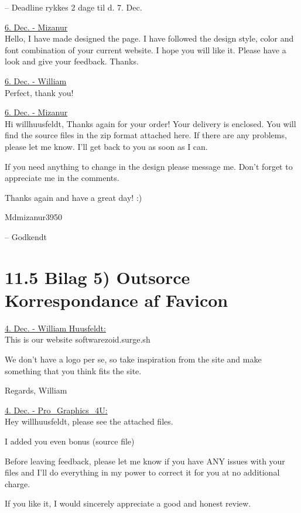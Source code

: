\documentclass[11pt]{report}
\begin{document}
\noindent -- Deadline rykkes 2 dage til d. 7. Dec.

\noindent\underline{6. Dec. - Mizanur}\\
\noindent Hello, I have made designed the page. I have followed the design style, color and font combination of your current website. I hope you will like it. Please have a look and give your feedback. Thanks.

\noindent\underline{6. Dec. - William}\\
\noindent Perfect, thank you!

\noindent\underline{6. Dec. - Mizanur}\\
\noindent Hi willhuusfeldt,
\noindent Thanks again for your order! Your delivery is enclosed. You will find the source files in the zip format attached here. If there are any problems, please let me know. I'll get back to you as soon as I can.

\noindent If you need anything to change in the design please message me. Don't forget to appreciate me in the comments.

\noindent Thanks again and have a great day! :)

\noindent Mdmizanur3950

\noindent -- Godkendt


\newpage
\section*{11.5 Bilag 5) Outsorce Korrespondance af Favicon}


\noindent\underline{4. Dec. - William Huusfeldt:}\\
\noindent This is our website softwarezoid.surge.sh

\noindent We don't have a logo per se, so take inspiration from the site and make something that you think fits the site.

\noindent Regards, William

\noindent\underline{4. Dec. - Pro\_Graphics\_4U:}\\
\noindent Hey willhuusfeldt, please see the attached files.

\noindent I added you even bonus (source file)

\noindent Before leaving feedback, please let me know if you have ANY issues with your files and I'll do everything in my power to correct it for you at no additional charge.

\noindent If you like it, I would sincerely appreciate a good and honest review.
\end{document}
